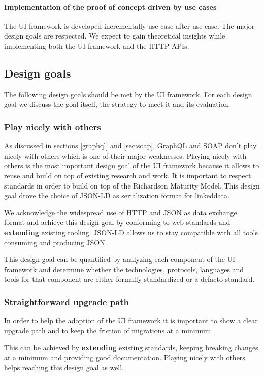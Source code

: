 \paragraph{Implementation of the proof of concept driven by use cases}
The UI framework is developed incrementally use case after use case. The major design goals are respected. We expect to gain theoretical insights while implementing both the UI framework and the HTTP APIs.

\subsection{Design goals}\label{sec:designgoals}
The following design goals should be met by the UI framework. For each design goal we discuss the goal itself, the strategy to meet it and its evaluation.

\subsubsection{Play nicely with others}\label{sec:playnice}
As discussed in sections \ref{graphql} and \ref{sec:soap}, GraphQL and SOAP don't play nicely with others which is one of their major weaknesses. Playing nicely with others is the most important design goal of the UI framework because it allows to reuse and build on top of existing research and work.
It is important to respect standards in order to build on top of the Richardson Maturity Model. This design goal drove the choice of JSON-LD as serialization format for \gls{linkeddata}.

We acknowledge the widespread use of HTTP and JSON as data exchange format and achieve this design goal by conforming to web standards and \textbf{extending} existing tooling. JSON-LD allows us to stay compatible with all tools consuming and producing JSON.

This design goal can be quantified by analyzing each component of the UI framework and determine whether the technologies, protocols, languages and tools for that component are either formally standardized or a defacto standard.

\subsubsection{Straightforward upgrade path}
In order to help the adoption of the UI framework it is important to show a clear upgrade path and to keep the friction of migrations at a minimum.

This can be achieved by \textbf{extending} existing standards, keeping breaking changes at a minimum and providing good documentation. Playing nicely with others helps reaching this design goal as well.

